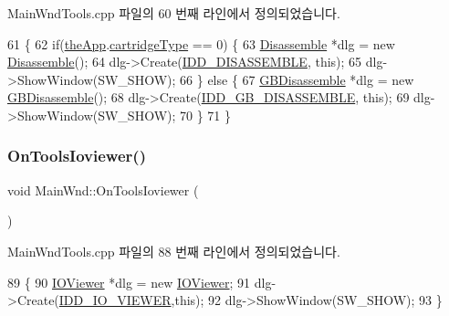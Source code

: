 Main\+Wnd\+Tools.\+cpp 파일의 60 번째 라인에서 정의되었습니다.


\begin{DoxyCode}
61 \{
62   \textcolor{keywordflow}{if}(\mbox{\hyperlink{_v_b_a_8cpp_a8095a9d06b37a7efe3723f3218ad8fb3}{theApp}}.\mbox{\hyperlink{class_v_b_a_af300759fcbc7eeb00ce73f956fc5ddb7}{cartridgeType}} == 0) \{
63     \mbox{\hyperlink{class_disassemble}{Disassemble}} *dlg = \textcolor{keyword}{new} \mbox{\hyperlink{class_disassemble}{Disassemble}}();
64     dlg->Create(\mbox{\hyperlink{resource_8h_ab61c113ce3315c790b521edf74501d0a}{IDD\_DISASSEMBLE}}, \textcolor{keyword}{this});
65     dlg->ShowWindow(SW\_SHOW);
66   \} \textcolor{keywordflow}{else} \{
67     \mbox{\hyperlink{class_g_b_disassemble}{GBDisassemble}} *dlg = \textcolor{keyword}{new} \mbox{\hyperlink{class_g_b_disassemble}{GBDisassemble}}();
68     dlg->Create(\mbox{\hyperlink{resource_8h_a91377affef0e606098c85e3f2f59383b}{IDD\_GB\_DISASSEMBLE}}, \textcolor{keyword}{this});
69     dlg->ShowWindow(SW\_SHOW);
70   \}
71 \}
\end{DoxyCode}
\mbox{\label{class_main_wnd_a7c63493ab974ac97642c7ac683cdb6f1}} 
\subsubsection{\texorpdfstring{On\+Tools\+Ioviewer()}{OnToolsIoviewer()}}
{\footnotesize\ttfamily void Main\+Wnd\+::\+On\+Tools\+Ioviewer (\begin{DoxyParamCaption}{ }\end{DoxyParamCaption})\hspace{0.3cm}{\ttfamily [protected]}}



Main\+Wnd\+Tools.\+cpp 파일의 88 번째 라인에서 정의되었습니다.


\begin{DoxyCode}
89 \{
90   \mbox{\hyperlink{class_i_o_viewer}{IOViewer}} *dlg = \textcolor{keyword}{new} \mbox{\hyperlink{class_i_o_viewer}{IOViewer}};
91   dlg->Create(\mbox{\hyperlink{resource_8h_a9785c4bb044231394fb1afda34b138fc}{IDD\_IO\_VIEWER}},\textcolor{keyword}{this});
92   dlg->ShowWindow(SW\_SHOW);
93 \}
\end{DoxyCode}
\mbox{\label{class_main_wnd_a18b152a47c0ce3d299120f5b3631232b}} 

